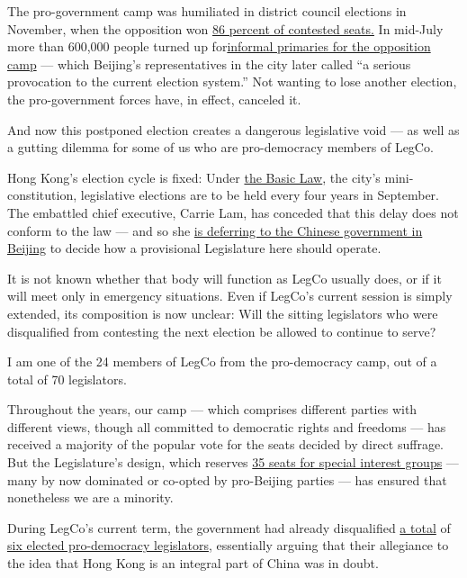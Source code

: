 The pro-government camp was humiliated in district council elections in
November, when the opposition won
\href{https://www.nytimes.com/2019/11/24/world/asia/hong-kong-election-results.html}{86
percent of contested seats.} In mid-July more than 600,000 people turned
up
for\href{https://hongkongfp.com/2020/07/14/serious-provocation-beijing-blasts-hong-kong-democrat-primaries-after-initial-results-reveal/}{informal
primaries for the opposition camp} --- which Beijing's representatives
in the city later called ``a serious provocation to the current election
system.'' Not wanting to lose another election, the pro-government
forces have, in effect, canceled it.

And now this postponed election creates a dangerous legislative void ---
as well as a gutting dilemma for some of us who are pro-democracy
members of LegCo.

Hong Kong's election cycle is fixed: Under
\href{https://www.basiclaw.gov.hk/en/basiclawtext/images/basiclaw_full_text_en.pdf}{the
Basic Law}, the city's mini-constitution, legislative elections are to
be held every four years in September. The embattled chief executive,
Carrie Lam, has conceded that this delay does not conform to the law ---
and so she
\href{https://www.info.gov.hk/gia/general/202007/31/P2020073101081.htm?fontSize=1}{is
deferring to the Chinese government in Beijing} to decide how a
provisional Legislature here should operate.

It is not known whether that body will function as LegCo usually does,
or if it will meet only in emergency situations. Even if LegCo's current
session is simply extended, its composition is now unclear: Will the
sitting legislators who were disqualified from contesting the next
election be allowed to continue to serve?

I am one of the 24 members of LegCo from the pro-democracy camp, out of
a total of 70 legislators.

Throughout the years, our camp --- which comprises different parties
with different views, though all committed to democratic rights and
freedoms --- has received a majority of the popular vote for the seats
decided by direct suffrage. But the Legislature's design, which reserves
\href{https://www.reo.gov.hk/en/voter/FC.htm}{35 seats for special
interest groups} --- many by now dominated or co-opted by pro-Beijing
parties --- has ensured that nonetheless we are a minority.

During LegCo's current term, the government had already disqualified
\href{https://www.nytimes.com/2016/11/08/world/asia/china-hong-kong-sixtus-leung-yau-wai-ching.html}{a
total} of
\href{https://www.nytimes.com/2017/07/14/world/asia/hong-kong-court-pro-democracy-lawmakers.html}{six
elected pro-democracy legislators}, essentially arguing that their
allegiance to the idea that Hong Kong is an integral part of China was
in doubt.

